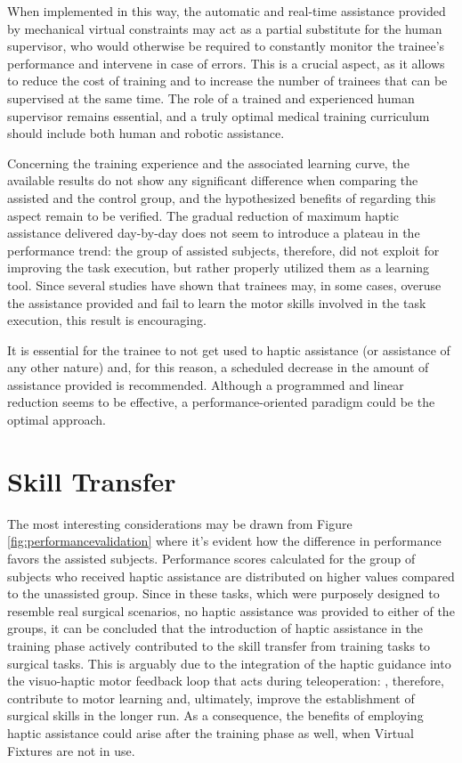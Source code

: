 \documentclass[../main.tex]{subfiles}
\begin{document}
When implemented in this way, the automatic and real-time assistance provided by mechanical virtual constraints may act as a partial substitute for the human supervisor, who would otherwise be required to constantly monitor the trainee's performance and intervene in case of errors. This is a crucial aspect, as it allows to reduce the cost of training and to increase the number of trainees that can be supervised at the same time. The role of a trained and experienced human supervisor remains essential, and a truly optimal medical training curriculum should include both human and robotic assistance. 

Concerning the training experience and the associated learning curve, the available results do not show any significant difference when comparing the assisted and the control group, and the hypothesized benefits of \vfs regarding this aspect remain to be verified. The gradual reduction of maximum haptic assistance delivered day-by-day does not seem to introduce a plateau in the performance trend: the group of assisted subjects, therefore, did not exploit \vfs for improving the task execution, but rather properly utilized them as a learning tool. Since several studies have shown that trainees may, in some cases, overuse the assistance provided and fail to learn the motor skills involved in the task execution, this result is encouraging.

It is essential for the trainee to not get used to haptic assistance (or assistance of any other nature) and, for this reason, a scheduled decrease in the amount of assistance provided is recommended. Although a programmed and linear reduction seems to be effective, a performance-oriented paradigm could be the optimal approach.

\section{Skill Transfer}

The most interesting considerations may be drawn from Figure \ref{fig:performancevalidation} where it's evident how the difference in performance favors the assisted subjects. Performance scores calculated for the group of subjects who received haptic assistance are distributed on higher values compared to the unassisted group. 
Since in these tasks, which were purposely designed to resemble real surgical scenarios, no haptic assistance was provided to either of the groups, it can be concluded that the introduction of haptic assistance in the training phase actively contributed to the skill transfer from training tasks to surgical tasks. This is arguably due to the integration of the haptic guidance into the visuo-haptic motor feedback loop that acts during teleoperation: \vfs, therefore, contribute to motor learning and, ultimately, improve the establishment of surgical skills in the longer run. As a consequence, the benefits of employing haptic assistance could arise after the training phase as well, when Virtual Fixtures are not in use.
\end{document}
